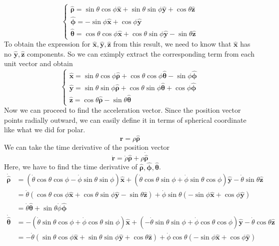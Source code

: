 \documentclass[12pt]{article}
\newcommand{\paren}[1]{\left( #1 \right)}
\newcommand{\unx}{\hat{\mathbf{x}}}
\newcommand{\uny}{\hat{\mathbf{y}}}
\newcommand{\unz}{\hat{\mathbf{z}}}
\newcommand{\untheta}{\hat{\boldsymbol\theta}}
\newcommand{\unphi}{\hat{\boldsymbol\phi}}
\newcommand{\unrho}{\hat{\boldsymbol\rho}}
\begin{document}
\begin{enumerate}
\[\begin{cases}
        \unrho = \sin\theta\cos\phi \unx + \sin\theta\sin\phi\uny + \cos\theta \unz\\
        \unphi = -\sin\phi\unx + \cos\phi \uny\\
        \untheta = \cos\theta\cos\phi \unx + \cos\theta\sin\phi \uny - \sin\theta \unz
    \end{cases}
    \]
    To obtain the expression for $\unx, \uny, \unz$ from this result, we need to know that $\unx$ has no $\uny,\unz$ components. So we can eximply extract the corresponding term from each unit vector and obtain
    \[
    \begin{cases}
        \unx = \sin\theta\cos\phi \unrho + \cos\theta\cos\phi \untheta -\sin\phi\unphi \\
        \uny = \sin\theta\sin\phi\unrho + \cos\theta\sin\phi\untheta +\cos\phi \unphi\\
        \unz =  \cos\theta\unrho - \sin\theta \untheta
    \end{cases}
    \]
    Now we can proceed to find the acceleration vector. Since the position vector points radially outward, we can easily define it in terms of spherical coordinate like what we did for polar. 
    \[
    \mathbf{r} = \rho\unrho
    \]
    We can take the time derivative of the position vector
    \[
    \dot{\mathbf{r}} = \dot{\rho}\unrho + \rho\dot{\unrho}
    \]
    Here, we have to find the time derivative of $\unrho,\unphi,\untheta$.
    \begin{align*}
        \dot{\unrho} &= \paren{\dot{\theta}\cos\theta\cos\phi -\dot{\phi}\sin\theta\sin\phi}\unx
                     + \paren{\dot{\theta}\cos\theta\sin\phi + \dot{\phi}\sin\theta\cos\phi}\uny
                     -\dot{\theta}\sin\theta \unz\\
                     &=\dot{\theta}\paren{\cos\theta\cos\phi \unx + \cos\theta\sin\phi \uny -\sin\theta\unz}+\dot{\phi}\sin\theta\paren{-\sin\phi \unx +\cos\phi \uny}\\
                     &= \dot{\theta}\untheta + \sin\theta\dot{\phi}\unphi
    \end{align*}
    \begin{align*}
        \dot{\untheta} &= -\paren{\dot{\theta}\sin\theta\cos\phi + \dot{\phi}\cos\theta\sin\phi}\unx + \paren{-\dot{\theta}\sin\theta\sin\phi + \dot{\phi}\cos\theta\cos\phi}\uny - \dot{\theta}\cos\theta\unz\\
                       &=-\dot{\theta}\paren{\sin\theta\cos\phi\unx + \sin\theta\sin\phi\uny +\cos\theta\unz} + \dot{\phi}\cos\theta\paren{-\sin\phi\unx + \cos\phi \uny}\\

\end{align*}
\end{enumerate}
\end{document}
